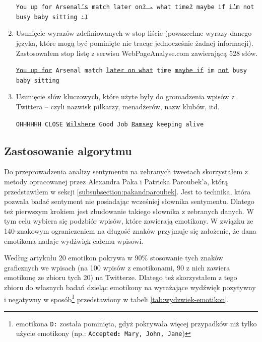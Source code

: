 \begin{enumerate}
  \texttt{You up for Arsenal\sout{'s} match later on\sout{? -} what
  time\sout{?} maybe if i\sout{'}m not busy baby sitting \sout{:)}} 
	
	\item Usunięcie wyrazów zdefiniowanych w stop liście (powszechne wyrazy danego
	języka, które mogą być pominięte nie tracąc jednocześnie żadnej informacji).
	Zastosowałem stop listę z serwisu \mbox{WebPageAnalyse.com} 
	\cite{WebPageAnalyse} zawierającą 528 słów.

	\texttt{\sout{You up for} Arsenal match \sout{later on what} time \sout{maybe if} 
 	im \sout{not} busy baby sitting}
	
	\item Usunięcie słów kluczowych, które użyte były do gromadzenia wpisów z
	Twittera -- czyli nazwisk piłkarzy, menadżerów, nazw klubów, itd.
	
	
	\texttt{OHHHHHH CLOSE \sout{Wilshere} Good Job \sout{Ramsey} keeping alive}
	
\end{enumerate}





\subsection{Zastosowanie algorytmu}
\label{subsection:sentyment-algorytm}

Do przeprowadzenia analizy sentymentu na zebranych tweetach skorzystałem z
metody opracowanej przez Alexandra Paka i Patricka Paroubek'a, którą 
przedstawiłem w sekcji \ref{subsubsection:pakandparoubek}.
Jest to technika, która pozwala badać sentyment nie posiadając wcześniej
słownika sentymentu. Dlatego też pierwszym krokiem jest zbudowanie takiego
słownika z zebranych danych.
W tym celu wybiera się podzbiór wpisów, które zawierają emotikony.
W związku ze 140-znakowym ograniczeniem na długość znaków przyjmuje się
założenie, że dana emotikona nadaje wydźwięk całemu wpisowi.

Według artykułu \cite{EmoticonAnalysisTwitter} 20 emotikon pokrywa w 90\%
stosowanie tych znaków graficznych we wpisach (na 100 wpisów z emotikonami, 90 z
nich zawiera emotikonę ze zbioru tych 20) na Twitterze. Dlatego też skorzystałem
z tego zbioru do własnych badań dzieląc emotikony na wyrażające wydźwięk pozytywny i
negatywny w sposób\footnote{emotikona \texttt{D:} została pominięta, gdyż
pokrywała więcej przypadków niż tylko użycie emotikony (np.:
\texttt{Accepte\textbf{d:} Mary, John, Jane})} przedstawiony w tabeli
\ref{tab:wydzwiek-emotikon}.


